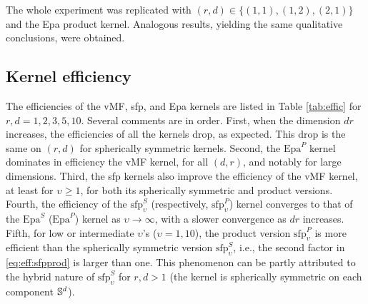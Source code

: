 \documentclass[oneside,11pt]{article}
\begin{document}
The whole experiment was replicated with $(r,d)\in\{(1,1),(1,2),(2,1)\}$ and the Epa product kernel. Analogous results, yielding the same qualitative conclusions, were obtained.

\subsection{Kernel efficiency}

The efficiencies of the vMF, sfp, and Epa kernels are listed in Table \ref{tab:effic} for $r,d=1,2,3,5,10$. Several comments are in order. First, when the dimension $dr$ increases, the efficiencies of all the kernels drop, as expected. This drop is the same on $(r,d)$ for spherically symmetric kernels. Second, the $\mathrm{Epa}^{P}$ kernel dominates in efficiency the vMF kernel, for all $(d,r)$, and notably for large dimensions. Third, the sfp kernels also improve the efficiency of the vMF kernel, at least for $\upsilon\geq1$, for both its spherically symmetric and product versions. Fourth, the efficiency of the $\mathrm{sfp}^{S}_{\upsilon}$ (respectively, $\mathrm{sfp}^{P}_{\upsilon}$) kernel converges to that of the $\mathrm{Epa}^{S}$ ($\mathrm{Epa}^{P}$) kernel as $\upsilon\to\infty$, with a slower convergence as $dr$ increases. Fifth, for low or intermediate $\upsilon$'s ($\upsilon=1,10$), the product version $\mathrm{sfp}^{P}_{\upsilon}$ is more efficient than the spherically symmetric version $\mathrm{sfp}^{S}_{\upsilon}$, i.e., the second factor in \eqref{eq:eff:sfpprod} is larger than one. This phenomenon can be partly attributed to the hybrid nature of $\mathrm{sfp}^{S}_{\upsilon}$ for $r,d>1$ (the kernel is spherically symmetric on each component $\mathbb{S}^{d}$).
\end{document}
